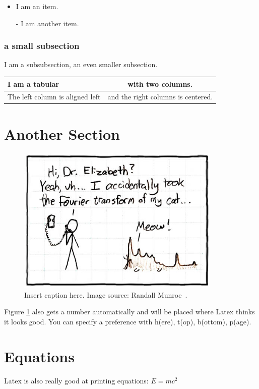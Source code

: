\documentclass[twoside,a4paper,article]{combine}
\begin{document}
\begin{itemize}
\item I am an item.
\item [-] I am another item.
\end{itemize}


\subsubsection{a small subsection}

I am a subsubsection, an even smaller subsection.

\begin{tabular}{lc}
\toprule
I am a tabular & with two columns. \\
\midrule
The left column is aligned left & and the right columns is centered. \\
\bottomrule
\end{tabular}


\section{Another Section}

\begin{figure}[h]
\centering
\includegraphics[height=200pt]{fourier}
\caption{Insert caption here. Image source: Randall Munroe~\cite{xkcd}. }
\label{example_figure}
\end{figure}
Figure \ref{example_figure} also gets a number automatically and will be placed where Latex thinks it looks good. You can specify a preference with h(ere), t(op), b(ottom), p(age).

\section{Equations}
Latex is also really good at printing equations: $E=mc^2$
\end{document}
